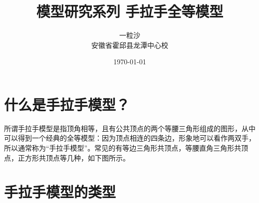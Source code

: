 \documentclass[10pt]{ctexart}
\title{模型研究系列 \quad 手拉手全等模型}
\author{一粒沙\\安徽省霍邱县龙潭中心校}
\date{\today}
\begin{document}
\maketitle
\tableofcontents


\section{什么是手拉手模型？}
所谓手拉手模型是指顶角相等，且有公共顶点的两个等腰三角形组成的图形，从中可以得到一个经典的全等模型：因为顶点相连的四条边，形象地可以看作两双手，所以通常称为“手拉手模型”。常见的有等边三角形共顶点，等腰直角三角形共顶点，正方形共顶点等几种，如下图所示。

\section{手拉手模型的类型}
\end{document}
